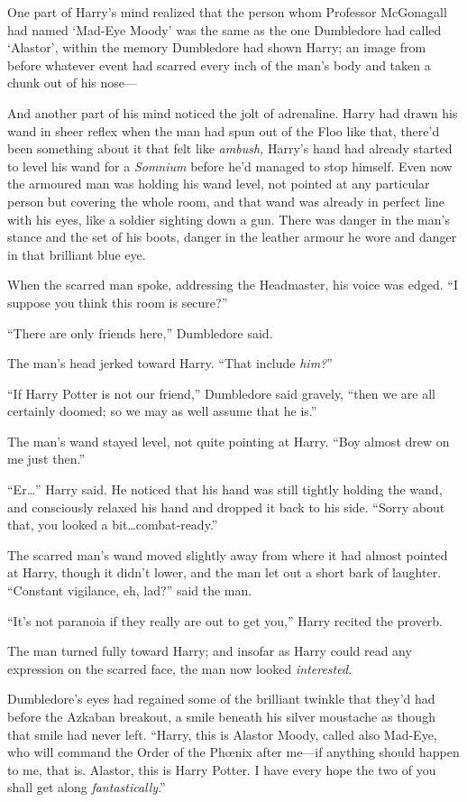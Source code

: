 One part of Harry’s mind realized that the person whom Professor McGonagall had named ‘Mad-Eye Moody’ was the same as the one Dumbledore had called ‘Alastor’, within the memory Dumbledore had shown Harry; an image from before whatever event had scarred every inch of the man’s body and taken a chunk out of his nose—

And another part of his mind noticed the jolt of adrenaline. Harry had drawn his wand in sheer reflex when the man had spun out of the Floo like that, there’d been something about it that felt like \emph{ambush,} Harry’s hand had already started to level his wand for a \emph{Somnium} before he’d managed to stop himself. Even now the armoured man was holding his wand level, not pointed at any particular person but covering the whole room, and that wand was already in perfect line with his eyes, like a soldier sighting down a gun. There was danger in the man’s stance and the set of his boots, danger in the leather armour he wore and danger in that brilliant blue eye.

When the scarred man spoke, addressing the Headmaster, his voice was edged. “I suppose you think this room is secure?”

“There are only friends here,” Dumbledore said.

The man’s head jerked toward Harry. “That include \emph{him?}”

“If Harry Potter is not our friend,” Dumbledore said gravely, “then we are all certainly doomed; so we may as well assume that he is.”

The man’s wand stayed level, not quite pointing at Harry. “Boy almost drew on me just then.”

“Er…” Harry said. He noticed that his hand was still tightly holding the wand, and consciously relaxed his hand and dropped it back to his side. “Sorry about that, you looked a bit…combat-ready.”

The scarred man’s wand moved slightly away from where it had almost pointed at Harry, though it didn’t lower, and the man let out a short bark of laughter. “Constant vigilance, eh, lad?” said the man.

“It’s not paranoia if they really are out to get you,” Harry recited the proverb.

The man turned fully toward Harry; and insofar as Harry could read any expression on the scarred face, the man now looked \emph{interested}.

Dumbledore’s eyes had regained some of the brilliant twinkle that they’d had before the Azkaban breakout, a smile beneath his silver moustache as though that smile had never left. “Harry, this is Alastor Moody, called also Mad-Eye, who will command the Order of the Phœnix after me—if anything should happen to me, that is. Alastor, this is Harry Potter. I have every hope the two of you shall get along \emph{fantastically}.”

